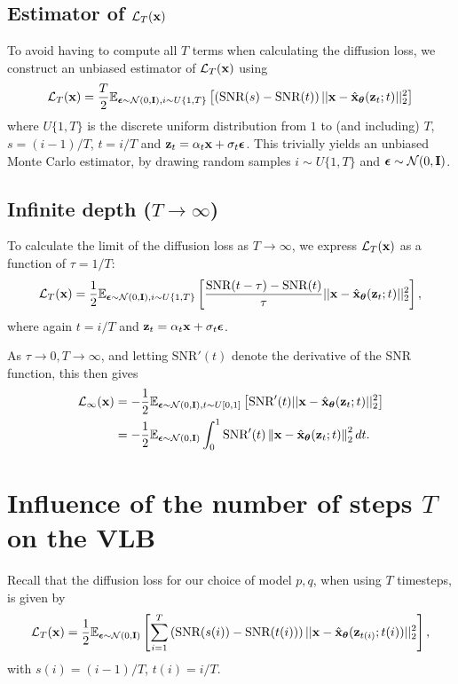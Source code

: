 \documentclass{article}
\newcommand{\lT}{\mathcal{L}_T(\rvx)}
\newcommand{\linfty}{\mathcal{L}_{\infty}(\rvx)}
\newcommand{\snr}{\text{SNR}}
\begin{document}
\subsection{Estimator of $\lT$}
To avoid having to compute all $T$ terms when calculating the diffusion loss, we construct an unbiased estimator of $\lT$ using
\begin{align}
\lT =
\frac{T}{2}
\E_{\bepsilon \sim \mathcal{N}(0,\bfI), i \sim U\{1, T\}}
\left[
\left(\text{SNR}(s)-\text{SNR}(t)\right)
||\rvx - \hat{\rvx}_{\bT}(\rvz_t;t) ||_2^2
\right]\end{align}
where $U\{1, T\}$ is the discrete uniform distribution from $1$ to (and including) $T$, $s = (i-1)/T$, $t = i/T$ and ${\mathbf{z}}_t = \alpha_t {\mathbf{x}} + \sigma_t {\boldsymbol{\epsilon}}$. This trivially yields an unbiased Monte Carlo estimator, by drawing random samples $i \sim U\{1, T\}$ and ${\boldsymbol{\epsilon}} \sim \mathcal{N}(0,\mathbf{I})$.



%
%

%
%

\subsection{Infinite depth ($T \to \infty$) }\label{sec:infdepth}
To calculate the limit of the diffusion loss as $T\rightarrow\infty$, we express $\lT$ as a function of $\tau = 1/T$:
\begin{align}
\lT =
\frac{1}{2}
\E_{\bepsilon \sim \mathcal{N}(0,\bfI), i \sim U\{1, T\}}
\left[
\frac{\text{SNR}(t-\tau)-\text{SNR}(t)}{\tau}
||\rvx - \hat{\rvx}_{\bT}(\rvz_t;t) ||_2^2
\right],
\end{align}
where again $t = i/T$ and ${\mathbf{z}}_t = \alpha_t {\mathbf{x}} + \sigma_t {\boldsymbol{\epsilon}}$.

As $\tau \rightarrow 0, T \rightarrow \infty$, and letting $\snr'(t)$ denote the derivative of the SNR function, this then gives
\begin{align}
\linfty &=
-\frac{1}{2}
\E_{\bepsilon \sim \mathcal{N}(0,\bfI), t \sim U[0,1]}
\left[\snr'(t)||\rvx - \hat{\rvx}_{\bT}(\rvz_t;t) ||_2^2
\right]\\
&= -\frac{1}{2}\E_{\bepsilon\sim\mathcal{N}(0,\bfI)} \int_{0}^{1} \snr'(t) \left\rVert \rvx - \hat{\rvx}_{\bT}(\rvz_t;t) \right\lVert_{2}^{2} dt
.
\end{align}

\section{Influence of the number of steps $T$ on the VLB}
\label{appendix:more_steps}
Recall that the diffusion loss for our choice of model $p,q$, when using $T$ timesteps, is given by
\begin{align}
\lT =
\frac{1}{2}\E_{\bepsilon \sim \mathcal{N}(0,\bfI)}
\left[\sum_{i=1}^T
\left(\snr(s(i))-\snr(t(i))\right)
||\rvx - \hat{\rvx}_{\bT}(\rvz_{t(i)};t(i)) ||_2^2
\right],
\end{align}
with $s(i) = (i-1)/T$, $t(i) = i/T$.
\end{document}
